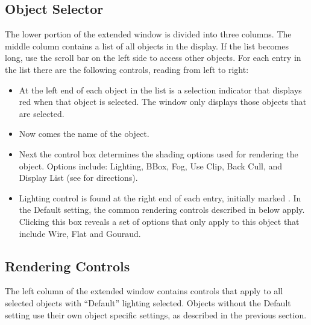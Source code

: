 \subsection{Object Selector}

The lower portion of the extended \viewer{} window is divided into three
columns. The middle column contains a list of all objects in the
display.  If the list becomes long, use the scroll bar on the left
side to access other objects.  For each entry in the list there are
the following controls, reading from left to right:

\begin{itemize}
  \item At the left end of each object
        in the list is a selection indicator that displays red
        when that object is 
        selected.  The \viewer{} window only displays those objects that
        are selected.
  \item Now comes the name of the object.
  \item Next the  control box determines the
        shading options used for rendering the object.
        Options include: Lighting, BBox, Fog, Use Clip, Back Cull, and
        Display List  (see
         for directions).
  \item Lighting control is found at the right end of each entry, initially
        marked .  In the Default setting, the common
        rendering controls described in  below apply.  Clicking this box
        reveals a set of options that only apply to this object that
        include Wire, Flat and Gouraud.
\end{itemize}


\subsection{Rendering Controls}
\label{sec:view-rendering} 

The left column of the extended \viewer{} window contains controls that
apply to all selected objects with ``Default'' lighting selected.
Objects without the Default setting use their own object specific
settings, as described in the previous section.  

